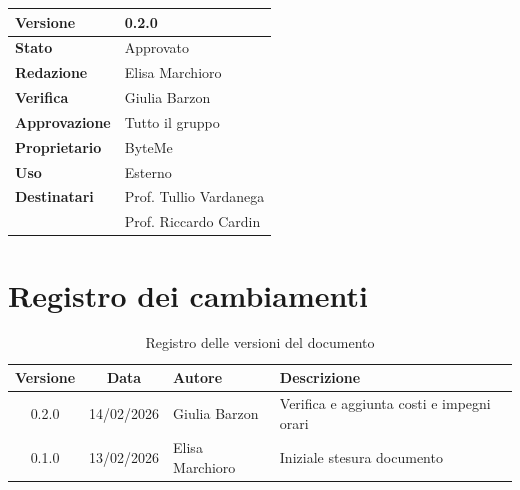 \documentclass[11pt,a4paper]{article}
\begin{document}
\begin{titlepage}
    \begin{table}[H]
        \centering
        \begin{tabular}{|l|p{5cm}|}
            \hline
            \textbf{Versione} & 0.2.0 \\
            \hline
            \textbf{Stato} & Approvato \\
            \hline
            \textbf{Redazione} & Elisa Marchioro \\
            \hline
            \textbf{Verifica} & Giulia Barzon\\
            \hline
            \textbf{Approvazione} & Tutto il gruppo \\
            \hline
            \textbf{Proprietario} & ByteMe \\
            \hline
            \textbf{Uso} & Esterno \\
            \hline
            \textbf{Destinatari} & Prof. Tullio Vardanega \\ & Prof. Riccardo Cardin \\
            \hline
        \end{tabular}
    \end{table}
    
    \vfill
\end{titlepage}

\section*{Registro dei cambiamenti}

\begin{table}[H]
    \centering
    \begin{tabular}{|c|c|>{\raggedright\arraybackslash}p{}|>{\raggedright\arraybackslash}p{}|}
        \hline
        \textbf{Versione} & \textbf{Data} & \textbf{Autore} & \textbf{Descrizione} \\
        \hline
        0.2.0 & 14/02/2026 & Giulia Barzon & Verifica e aggiunta costi e impegni orari \\
        \hline
        0.1.0 & 13/02/2026 & Elisa Marchioro & Iniziale stesura documento \\
        \hline
    \end{tabular}
    \caption{Registro delle versioni del documento}
    \label{tab:versionamento}
\end{table}

\newpage

\tableofcontents
\thispagestyle{empty}
\newpage
\end{document}
